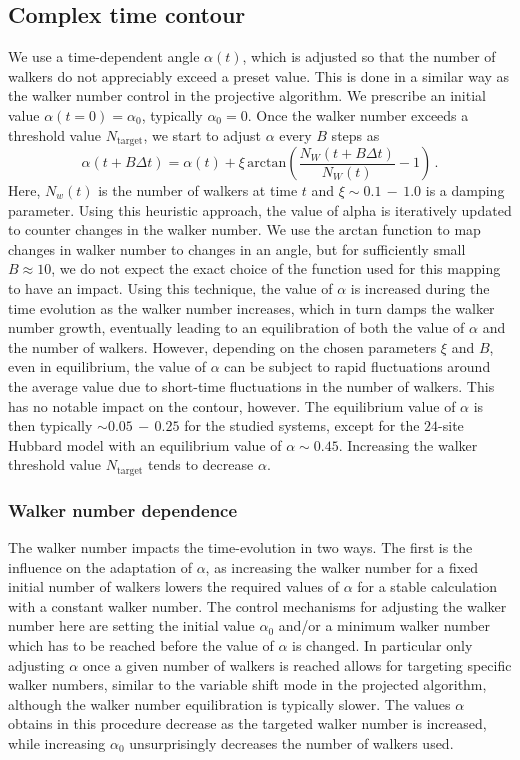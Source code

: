\subsection{Complex time contour}

We use a time-dependent angle $\alpha(t)$, which is adjusted so that the number 
of walkers do not appreciably exceed a preset value. This is done in a similar way 
as the walker number control in the projective algorithm. We prescribe 
an initial value $\alpha(t=0) = \alpha_0$, typically $\alpha_0=0$. Once the
walker number exceeds a threshold value $N_\mathrm{target}$, we start to adjust $\alpha$ every $B$
steps as 
\begin{equation}
\alpha (t + B\Delta t) = \alpha (t) + \xi\, \mathrm{arctan}\left(\frac{N_W\left(t+B\Delta
      t\right)}{N_W\left(t\right)} -1 \right) \,.
\end{equation}
Here, $N_w(t)$ is the number of walkers at time $t$ and $\xi \sim 0.1\, - \, 1.0$ is a damping
parameter. Using this heuristic approach, the value of alpha is iteratively
updated to counter changes in the walker number. We use the $\mathrm{arctan}$ function
to map changes in walker number to changes in an angle, but for sufficiently
small $B \approx 10 $, we do not expect the exact choice of the function used for
this mapping to have
an impact. Using this technique, the value of $\alpha$ is increased during the
time evolution as the walker number increases, which in turn damps the walker
number growth, eventually leading to an equilibration of both the value of $\alpha$
and the number of walkers. However, depending on the chosen parameters $\xi$
and $B$, even in equilibrium, the value of $\alpha$ can be subject to rapid
fluctuations around the average value due to short-time fluctuations in the
number of walkers. This has no notable impact on the contour, however. The equilibrium value of $\alpha$ is then typically $\sim
0.05\,-\,0.25$ for the studied systems, except for the $24$-site Hubbard model
with an equilibrium value of $\alpha \sim 0.45$.
Increasing the walker threshold value $N_\mathrm{target}$ tends to decrease $\alpha$. 
 
\subsubsection{Walker number dependence}

The walker number impacts the time-evolution in two ways. The first is the
influence on the adaptation of $\alpha$, as increasing the walker number for a
fixed initial number of walkers lowers the required values of $\alpha$ for a
stable calculation with a constant walker number. The control mechanisms for
adjusting the walker number here are setting the initial value $\alpha_0$
and/or a minimum walker number which has to be reached before the value of
$\alpha$ is changed. In particular only adjusting $\alpha$ once a given
number of walkers is reached allows for targeting specific walker numbers,
similar to the variable shift mode in the projected algorithm, although the
walker number equilibration is typically slower. The values
$\alpha$ obtains in this procedure decrease as the targeted walker number is
increased, while increasing $\alpha_0$ unsurprisingly decreases the number of
walkers used. 

